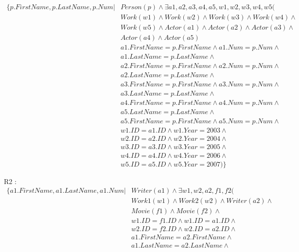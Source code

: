 \documentclass[a4paper,12pt]{article}
\begin{document}
\begin{list}{-}{}
    \begin{align*}
    \{ p.FirstName, p.LastName, p.Num | &Person(p) \wedge \exists a1, a2, a3, a4, a5, w1, w2, w3, w4, w5 ( \\
    & Work(w1) \wedge Work(w2) \wedge Work(w3) \wedge Work(w4) \wedge \\
    & Work(w5) \wedge Actor(a1) \wedge Actor(a2) \wedge Actor(a3) \wedge \\
    & Actor(a4) \wedge Actor(a5) \\
    & a1.FirstName = p.FirstName \wedge a1.Num = p.Num \wedge \\
    & a1.LastName = p.LastName \wedge \\
    & a2.FirstName = p.FirstName \wedge a2.Num = p.Num \wedge \\
    & a2.LastName = p.LastName \wedge \\
    & a3.FirstName = p.FirstName \wedge a3.Num = p.Num \wedge \\
    & a3.LastName = p.LastName \wedge \\
    & a4.FirstName = p.FirstName \wedge a4.Num = p.Num \wedge \\
    & a5.LastName = p.LastName \wedge \\
    & a5.FirstName = p.FirstName \wedge a5.Num = p.Num \wedge \\
    & w1.ID = a1.ID \wedge w1.Year = 2003 \wedge \\
    & w2.ID = a2.ID \wedge w2.Year = 2004 \wedge \\
    & w3.ID = a3.ID \wedge w3.Year = 2005 \wedge \\
    & w4.ID = a4.ID \wedge w4.Year = 2006 \wedge \\
    & w5.ID = a5.ID \wedge w5.Year = 2007)\}
    \end{align*}
  \item R2 :
    \begin{align*}
      \{ a1.FirstName, a1.LastName, a1.Num | &Writer(a1) \wedge \exists w1, w2, a2, f1, f2 ( \\
      &Work1(w1) \wedge Work2(w2) \wedge Writer(a2) \wedge \\
      & Movie(f1) \wedge Movie(f2) \wedge \\
      & w1.ID = f1.ID \wedge w1.ID = a1.ID \wedge \\
      & w2.ID = f2.ID \wedge w2.ID = a2.ID \wedge \\
      & a1.FirstName = a2.FirstName \wedge \\
      & a1.LastName = a2.LastName \wedge \\

\end{align*}
\end{list}
\end{document}
